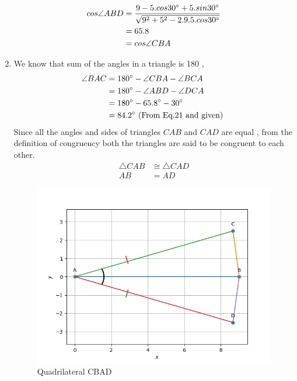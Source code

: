\documentclass{article}
\begin{document}
\begin{enumerate}
\begin{align}
	cos\angle{ABD} &= \frac{9-5.cos30\degree{}+5.sin30\degree{}}{\sqrt{9^2+5^2-2.9.5.cos30\degree{}}}\\
		       &= 65.8\\
                       &= cos\angle{CBA}\\
\end{align}
\item We know that sum of the angles in a triangle is 180\degree{} ,
\begin{align}
	\angle{BAC} & = 180\degree{} - \angle{CBA} - \angle{BCA}\\
		    & = 180\degree{} - \angle{ABD} - \angle{DCA} \\
		    & = 180\degree{} - 65.8\degree{} -30\degree{}\\
		    & = 84.2\degree{} \text{ (From Eq.21 and given) }
\end{align}
Since all the angles and sides of triangles $CAB$ and $CAD$ are equal , from the definition of congruency both the triangles are said to be congruent to each other.
\begin{align}
        \triangle{CAB} & \cong \triangle{CAD}\\
        AB &= AD 
\end{align}
\begin{figure}
	\begin{center}
		\includegraphics[width=\columnwidth]{figs/graph.png}
		\caption{Quadrilateral CBAD}
		\label{fig:Fig}
	\end{center}
\end{figure}
\end{enumerate}
\end{document}
